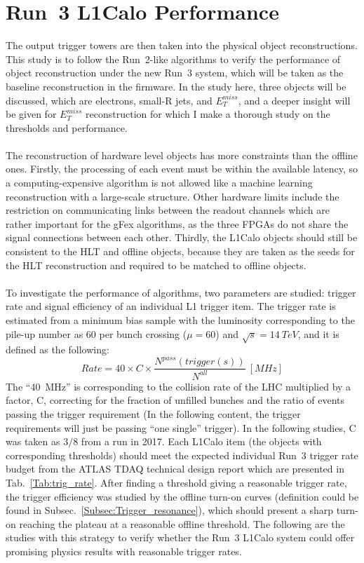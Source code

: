 \section{Run~3 L1Calo Performance}
\label{Sec:Trig_obj}
The output trigger towers are then taken into the physical object reconstructions. This study is to follow the Run~2-like algorithms to verify the performance of object reconstruction under the new Run~3 system, which will be taken as the baseline reconstruction in the firmware. In the study here, three objects will be discussed, which are electrons, small-R jets, and $E^{miss}_{T}$, and a deeper insight will be given for $E^{miss}_{T}$ reconstruction for which I make a thorough study on the thresholds and performance. 
\\
\\The reconstruction of hardware level objects has more constraints than the offline ones. Firstly, the processing of each event must be within the available latency, so a computing-expensive algorithm is not allowed like a machine learning reconstruction with a large-scale structure. Other hardware limits include the restriction on communicating links between the readout channels which are rather important for the gFex algorithms, as the three FPGAs do not share the signal connections between each other. Thirdly, the L1Calo objects should still be consistent to the HLT and offline objects, because they are taken as the seeds for the HLT reconstruction and required to be matched to offline objects. 
\\
\\To investigate the performance of algorithms, two parameters are studied: trigger rate and signal efficiency of an individual L1 trigger item. The trigger rate is estimated from a minimum bias sample with the luminosity corresponding to the pile-up number as 60 per bunch crossing ($\mu=60$) and $\sqrt{s}=14~TeV$, and it is defined as the following:
\begin{equation}
Rate = 40\times C\times\frac{N^{pass}(trigger(s))}{N^{all}}~[MHz]
\end{equation} 
The ``40~MHz'' is corresponding to the collision rate of the LHC multiplied by a factor, C, correcting for the fraction of unfilled bunches and the ratio of events passing the trigger requirement (In the following content, the trigger requirements will just be passing ``one single'' trigger). In the following studies, C was taken as $3/8$ from a run in 2017. Each L1Calo item (the objects with corresponding thresholds) should meet the expected individual Run~3 trigger rate budget from the ATLAS TDAQ technical design report\cite{Aad:1602235} which are presented in Tab.~\ref{Tab:trig_rate}. After finding a threshold giving a reasonable trigger rate, the trigger efficiency was studied by the offline turn-on curves (definition could be found in Subsec.~\ref{Subsec:Trigger_resonance}), which should present a sharp turn-on reaching the plateau at a reasonable offline threshold. The following are the studies with this strategy to verify whether the Run~3 L1Calo system could offer promising physics results with reasonable trigger rates. 
